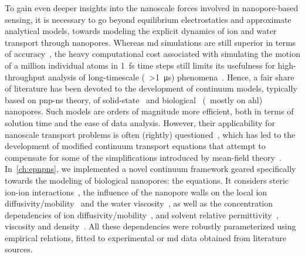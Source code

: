 To gain even deeper insights into the nanoscale forces involved in nanopore-based sensing, it is necessary to
go beyond equilibrium electrostatics and approximate analytical models, towards modeling the explicit dynamics
of ion and water transport through nanopores. Whereas \gls{md} simulations are still superior in terms of
accuracy~\cite{Aksimentiev-2005,DeBiase-2016,Basdevant-2019}, the heavy computational cost associated with
simulating the motion of a million individual atoms in \SI{1}{\fs} time steps still limits its usefulness for
high-throughput analysis of long-timescale (\ie~\SI{>1}{\us}) phenomena~\cite{Vendruscolo-2011,Phillips-2020}.
Hence, a fair share of literature has been devoted to the development of continuum models, typically based on
\gls{pnp-ns} theory, of
solid-state~\cite{Daiguji-2004,Cervera-2005,White-2008,Lu-2012,Chaudhry-2014,Laohakunakorn-2015,Hulings-2018,Rigo-2019,Melnikov-2020}
and
biological~\cite{Noskov-2004,Cozmuta-2005,OKeeffe-2007,Simakov-2010,Pederson-2015,Simakov-2018,Aguilella-Arzo-2020}
(\ie~mostly on \gls{ahl}) nanopores. Such models are orders of magnitude more efficient, both in terms of
solution time and the ease of data analysis. However, their applicability for nanoscale transport problems is
often (rightly) questioned~\cite{Corry-2000,Collins-2012}, which has led to the development of modified
continuum transport equations that attempt to compensate for some of the simplifications introduced by
mean-field
theory~\cite{Noskov-2004,Baldessari-2008-1,Daiguji-2010,Simakov-2010,Lu-2011,Burger-2012,Chen-2016,Liu-2020}.
In~\cref{ch:epnpns}, we implemented a novel continuum framework geared specifically towards the modeling of
biological nanopores: the  equations. It considers steric ion-ion
interactions~\cite{Daiguji-2010,Kilic-2007,Lu-2011,Liu-2020}, the influence of the nanopore walls on the local
ion diffusivity/mobility~\cite{Makarov-1998,Noskov-2004,Pederson-2015,Hulings-2018,Wilson-2019} and the water
viscosity~\cite{Pronk-2014,Vo-2016,Hsu-2017}, as well as the concentration dependencies of ion
diffusivity/mobility~\cite{Baldessari-2008-1,Burger-2012}, and solvent relative permittivity~\cite{Chen-2016},
viscosity and density~\cite{Hai-Lang-1996}. All these dependencies were robustly parameterized using empirical
relations, fitted to experimental or \gls{md} data obtained from literature sources.

